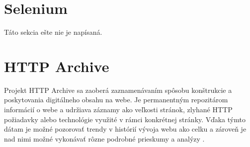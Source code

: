 
            
            


    


\section{Selenium}
\label{selenium}

Táto sekcia ešte nie je napísaná.

\section{HTTP Archive}
\label{httparchive}

Projekt HTTP Archive sa zaoberá zaznamenávaním spôsobu konštrukcie a poskytovania digitálneho obsahu na webe. Je permanentným repozitárom informácií o webe a udržiava záznamy ako veľkosti
stránok, zlyhané HTTP požiadavky alebo technológie využité v rámci konkrétnej stránky. Vďaka týmto dátam je možné pozorovať trendy v histórií vývoja webu ako celku a zároveň je nad nimi možné vykonávať
rôzne podrobné prieskumy a analýzy \cite{httparchive-about}. 


